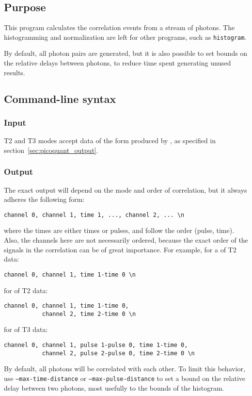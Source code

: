 \subsection{Purpose}
This program calculates the correlation events from a stream of photons. The histogramming and normalization are left for other programs, such as \texttt{histogram}.

By default, all photon pairs are generated, but it is also possible to set bounds on the relative delays between photons, to reduce time spent generating unused results.

\subsection{Command-line syntax}


\subsubsection{Input}
T2 and T3 modes accept data of the form produced by , as specified in section~\ref{sec:picoquant_output}.

\subsubsection{Output}
The exact output will depend on the mode and order of correlation, but it always adheres the following form:
\begin{verbatim}
channel 0, channel 1, time 1, ..., channel 2, ... \n
\end{verbatim}
where the times are either times or pulses, and follow the order (pulse, time). Also, the channels here are not necessarily ordered, because the exact order of the signals in the correlation can be of great importance. For example, for a  of T2 data:
\begin{verbatim}
channel 0, channel 1, time 1-time 0 \n
\end{verbatim}
for  of T2 data:
\begin{verbatim}
channel 0, channel 1, time 1-time 0, 
           channel 2, time 2-time 0 \n
\end{verbatim}
for  of T3 data:
\begin{verbatim}
channel 0, channel 1, pulse 1-pulse 0, time 1-time 0,
           channel 2, pulse 2-pulse 0, time 2-time 0 \n
\end{verbatim}

By default, all photons will be correlated with each other. To limit this behavior, use \texttt{--max-time-distance} or \texttt{--max-pulse-distance} to set a bound on the relative delay between two photons, most usefully to the bounds of the histogram.

